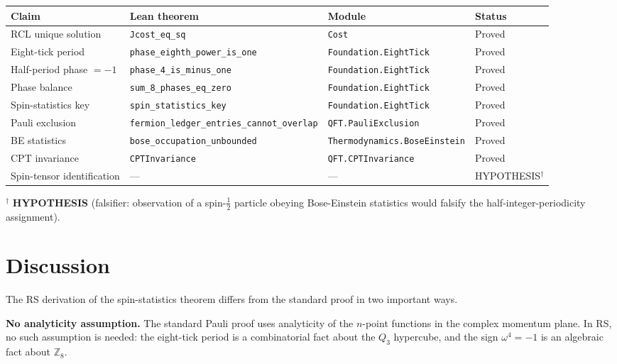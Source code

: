 \documentclass[12pt,a4paper]{article}
\theoremstyle{definition}
\theoremstyle{remark}
\begin{document}
\begin{center}
\begin{tabular}{llll}
\toprule
Claim & Lean theorem & Module & Status \\
\midrule
RCL unique solution & \texttt{Jcost\_eq\_sq} & \texttt{Cost} & Proved \\
Eight-tick period & \texttt{phase\_eighth\_power\_is\_one} & \texttt{Foundation.EightTick} & Proved \\
Half-period phase $= -1$ & \texttt{phase\_4\_is\_minus\_one} & \texttt{Foundation.EightTick} & Proved \\
Phase balance & \texttt{sum\_8\_phases\_eq\_zero} & \texttt{Foundation.EightTick} & Proved \\
Spin-statistics key & \texttt{spin\_statistics\_key} & \texttt{Foundation.EightTick} & Proved \\
Pauli exclusion & \texttt{fermion\_ledger\_entries\_cannot\_overlap} & \texttt{QFT.PauliExclusion} & Proved \\
BE statistics & \texttt{bose\_occupation\_unbounded} & \texttt{Thermodynamics.BoseEinstein} & Proved \\
CPT invariance & \texttt{CPTInvariance} & \texttt{QFT.CPTInvariance} & Proved \\
\midrule
Spin-tensor identification & --- & --- & HYPOTHESIS$^\dagger$ \\
\bottomrule
\end{tabular}
\end{center}

$^\dagger$ \textbf{HYPOTHESIS} (falsifier: observation of a spin-$\tfrac{1}{2}$
particle obeying Bose-Einstein statistics would falsify the
half-integer-periodicity assignment).

\section{Discussion}
\label{sec:discussion}

The RS derivation of the spin-statistics theorem differs from the
standard proof in two important ways.

\textbf{No analyticity assumption.}  The standard Pauli proof uses
analyticity of the $n$-point functions in the complex
momentum plane.  In RS, no such assumption is needed: the eight-tick
period is a combinatorial fact about the $Q_3$ hypercube, and the sign
$\omega^4 = -1$ is an algebraic fact about $\mathbb{Z}_8$.
\end{document}

